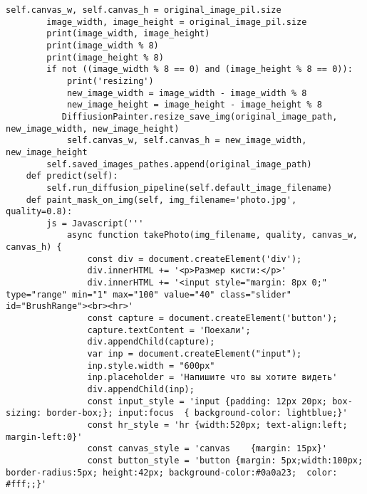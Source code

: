 \begin{lstlisting}[basicstyle=\ttfamily\small]
            self.canvas_w, self.canvas_h = original_image_pil.size
        image_width, image_height = original_image_pil.size
        print(image_width, image_height)
        print(image_width % 8)
        print(image_height % 8)
        if not ((image_width % 8 == 0) and (image_height % 8 == 0)):
            print('resizing')
            new_image_width = image_width - image_width % 8
            new_image_height = image_height - image_height % 8
           DiffiusionPainter.resize_save_img(original_image_path, new_image_width, new_image_height)
            self.canvas_w, self.canvas_h = new_image_width, new_image_height
        self.saved_images_pathes.append(original_image_path)
    def predict(self):
        self.run_diffusion_pipeline(self.default_image_filename)
    def paint_mask_on_img(self, img_filename='photo.jpg', quality=0.8):
        js = Javascript('''
            async function takePhoto(img_filename, quality, canvas_w, canvas_h) {
                const div = document.createElement('div');
                div.innerHTML += '<p>Размер кисти:</p>'
                div.innerHTML += '<input style="margin: 8px 0;" type="range" min="1" max="100" value="40" class="slider" id="BrushRange"><br><hr>'
                const capture = document.createElement('button');
                capture.textContent = 'Поехали';
                div.appendChild(capture);
                var inp = document.createElement("input");
                inp.style.width = "600px"
                inp.placeholder = 'Напишите что вы хотите видеть'
                div.appendChild(inp);
                const input_style = 'input {padding: 12px 20px; box-sizing: border-box;}; input:focus  { background-color: lightblue;}'
                const hr_style = 'hr {width:520px; text-align:left; margin-left:0}'
                const canvas_style = 'canvas    {margin: 15px}'
                const button_style = 'button {margin: 5px;width:100px; border-radius:5px; height:42px; background-color:#0a0a23;  color: #fff;;}'
\end{lstlisting}
